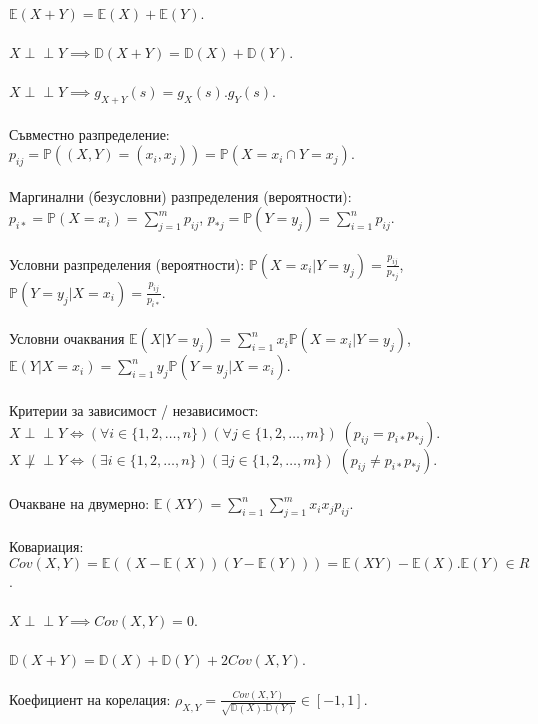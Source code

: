 \documentclass[10pt, a4paper]{article}
\newcommand{\prob}{\mathbb{P}}
\newcommand{\expect}{\mathbb{E}}
\newcommand{\disp}{\mathbb{D}}
\newcommand{\indep}{\perp \!\!\! \perp}
\begin{document}
\(\expect(X + Y) = \expect(X) + \expect(Y)\).
\\
\\
\(X \indep Y \implies \disp(X + Y) = \disp(X) + \disp(Y)\).
\\
\\
\(X \indep Y \implies g_{X + Y}(s) = g_X(s).g_Y(s)\).
\\
\\
Съвместно разпределение: \(p_{ij} = \prob((X, Y) = (x_i, x_j)) = \prob(X = x_i \cap Y = x_j)\).
\\
\\
Маргинални (безусловни) разпределения (вероятности): \\
\(p_{i*} = \prob(X = x_i) = \displaystyle\sum_{j = 1}^m p_{ij}\), \quad
\(p_{*j} = \prob(Y = y_j) = \displaystyle\sum_{i = 1}^n p_{ij}\).
\\
\\
Условни разпределения (вероятности):
\(\prob(X = x_i|Y = y_j) = \displaystyle\frac{p_{ij}}{p_{*j}}\), \quad
\(\prob(Y = y_j|X = x_i) = \displaystyle\frac{p_{ij}}{p_{i*}}\).
\\
\\
Условни очаквания \(\expect(X | Y = y_j) = \displaystyle\sum_{i = 1}^n x_i \prob(X = x_i | Y = y_j)\), \quad
\(\expect(Y | X = x_i) = \displaystyle\sum_{i = 1}^n y_j \prob(Y = y_j | X = x_i)\).
\\
\\
Критерии за зависимост / независимост: \\
\(X \indep Y \iff (\forall i \in \{1, 2, \dots, n\})(\forall j \in \{1, 2, \dots, m\})\;(p_{ij} = p_{i*}p_{*j})\).
\\
\(X \not\indep Y \iff (\exists i \in \{1, 2, \dots, n\})(\exists j \in \{1, 2, \dots, m\})\;(p_{ij} \neq p_{i*}p_{*j})\).
\\
\\
Очакване на двумерно: \(\expect(XY) = \displaystyle\sum_{i = 1}^n\displaystyle\sum_{j = 1}^m x_i x_j p_{ij}\).
\\
\\
Ковариация: \(Cov(X, Y) = \expect((X - \expect(X))(Y - \expect(Y)))
= \expect(XY) - \expect(X).\expect(Y) \in R\).
\\
\\
\(X \indep Y \implies Cov(X, Y) = 0\).
\\
\\
\(\disp(X + Y) = \disp(X) + \disp(Y) + 2 Cov(X, Y)\).
\\
\\
Коефициент на корелация: \(\rho_{X, Y} = \displaystyle\frac{Cov(X, Y)}{\sqrt{\disp(X).\disp(Y)}} \in [-1, 1]\).
\end{document}
